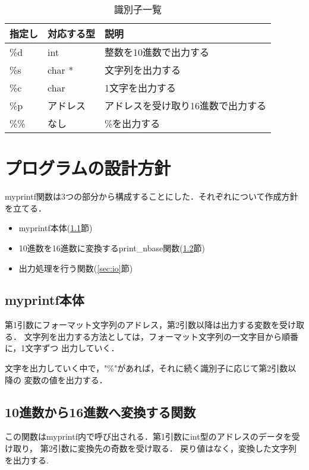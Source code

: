 \documentclass[11pt]{jarticle}
\begin{document}
\begin{table}[h]
  \begin{center}
  \label{table:ident}
  \caption{識別子一覧}
    \begin{tabular}{l|l|l}
      指定し & 対応する型 & 説明 \\ \hline
      \%d & int & 整数を10進数で出力する \\
      \%s & char * & 文字列を出力する \\
      \%c & char & 1文字を出力する \\
      \%p & アドレス & アドレスを受け取り16進数で出力する \\
      \%\% & なし & \%を出力する
    \end{tabular}
\end{center}
\end{table}

\section{プログラムの設計方針} \label{sec:policy}

myprintf関数は3つの部分から構成することにした．それぞれについて作成方針を立てる．

\begin{itemize}
  \item myprintf本体(\ref{sec:myprintf}節)
  \item 10進数を16進数に変換するprint\_nbase関数(\ref{sec:16base}節)
  \item 出力処理を行う関数(\ref{sec:io}節)
\end{itemize}

\subsection{myprintf本体} \label{sec:myprintf}

第1引数にフォーマット文字列のアドレス，第2引数以降は出力する変数を受け取る．
文字列を出力する方法としては，フォーマット文字列の一文字目から順番に，1文字ずつ
出力していく．

文字を出力していく中で，"\%"があれば，それに続く識別子に応じて第2引数以降の
変数の値を出力する．

\subsection{10進数から16進数へ変換する関数} \label{sec:16base}

この関数はmyprintf内で呼び出される．第1引数にint型のアドレスのデータを受け取り，
第2引数に変換先の奇数を受け取る．
戻り値はなく，変換した文字列を出力する.
\end{document}
